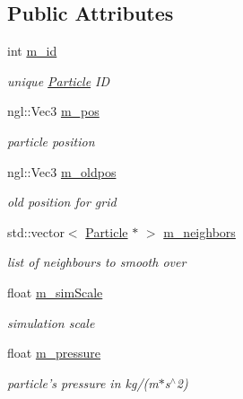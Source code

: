 \subsection*{Public Attributes}
\begin{DoxyCompactItemize}
\item 
int \hyperlink{classParticle_a24c5edf015f4c3d067acf1a054f31f93}{m\_\-id}
\begin{DoxyCompactList}\small\item\em unique \hyperlink{classParticle}{Particle} ID \item\end{DoxyCompactList}\item 
ngl::Vec3 \hyperlink{classParticle_a2b5ef8d7207002ec8e887492a5bbe9f2}{m\_\-pos}
\begin{DoxyCompactList}\small\item\em particle position \item\end{DoxyCompactList}\item 
ngl::Vec3 \hyperlink{classParticle_a4dcb620999acae9e32fa55ad39250c57}{m\_\-oldpos}
\begin{DoxyCompactList}\small\item\em old position for grid \item\end{DoxyCompactList}\item 
std::vector$<$ \hyperlink{classParticle}{Particle} $\ast$ $>$ \hyperlink{classParticle_a250b194672f141d8439af838422f4efb}{m\_\-neighbors}
\begin{DoxyCompactList}\small\item\em list of neighbours to smooth over \item\end{DoxyCompactList}\item 
float \hyperlink{classParticle_a5f9a1515ebe899af685c77d4f119ab45}{m\_\-simScale}
\begin{DoxyCompactList}\small\item\em simulation scale \item\end{DoxyCompactList}\item 
float \hyperlink{classParticle_a5c0abc7791d1fbfd584e38d509b6088e}{m\_\-pressure}
\begin{DoxyCompactList}\small\item\em particle's pressure in kg/(m$\ast$s$^\wedge$2) \item\end{DoxyCompactList}\item 

\end{DoxyCompactItemize}
